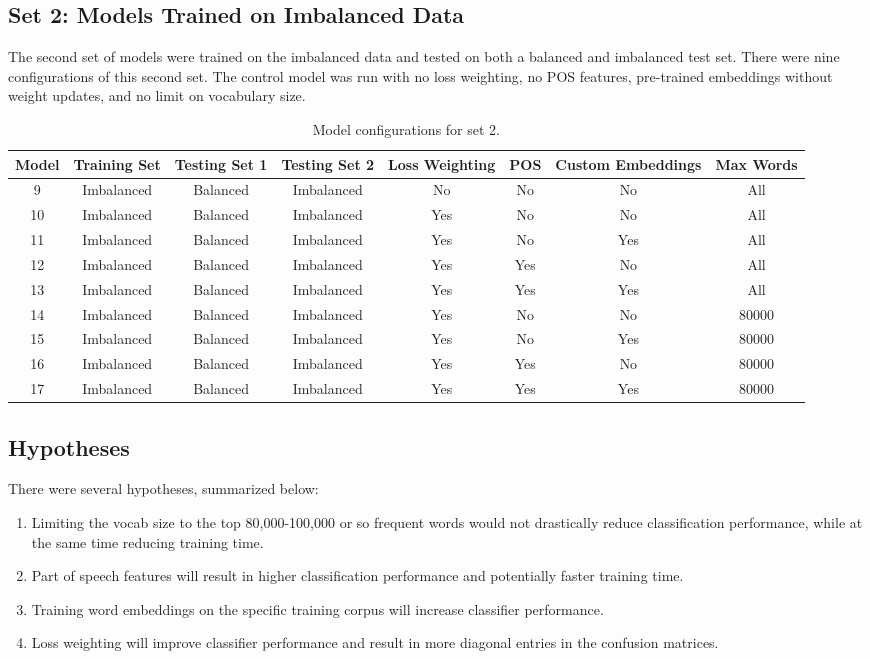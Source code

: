 \subsection{Set 2: Models Trained on Imbalanced Data}
The second set of models were trained on the imbalanced data and tested on both a balanced and imbalanced test set. There were nine configurations of this second set. The control model was run with no loss weighting, no POS features, pre-trained embeddings without weight updates, and no limit on vocabulary size. 
\begin{table}[ht]
	\centering
	\begin{tabular}{|c|c|c|c|c|c|c|c|}
		\hline
		Model & Training Set & Testing Set 1 & Testing Set 2 & Loss Weighting  & POS & Custom Embeddings & Max Words \\
		\hline
		9  & Imbalanced & Balanced & Imbalanced & No  & No & No & All \\
		10 & Imbalanced & Balanced & Imbalanced & Yes & No & No & All \\
		11 & Imbalanced & Balanced & Imbalanced & Yes & No & Yes & All  \\
		12 & Imbalanced & Balanced & Imbalanced & Yes & Yes & No & All \\
		13 & Imbalanced & Balanced & Imbalanced & Yes & Yes & Yes & All \\
		14 & Imbalanced & Balanced & Imbalanced & Yes & No & No & 80000 \\
		15 & Imbalanced & Balanced & Imbalanced & Yes & No & Yes & 80000 \\
		16 & Imbalanced & Balanced & Imbalanced & Yes & Yes & No & 80000 \\
		17 & Imbalanced & Balanced & Imbalanced & Yes & Yes & Yes & 80000 \\
		\hline
	\end{tabular}
	\caption{\label{tab:set2_exp}Model configurations for set 2.}
\end{table}

\subsection{Hypotheses}
There were several hypotheses, summarized below:
\begin{enumerate}
	\item Limiting the vocab size to the top 80,000-100,000 or so frequent words would not drastically reduce classification performance, while at the same time reducing training time.
	\item Part of speech features will result in higher classification performance and potentially faster training time.
	\item Training word embeddings on the specific training corpus will increase classifier performance.
	\item Loss weighting will improve classifier performance and result in more diagonal entries in the confusion matrices.
\end{enumerate}

